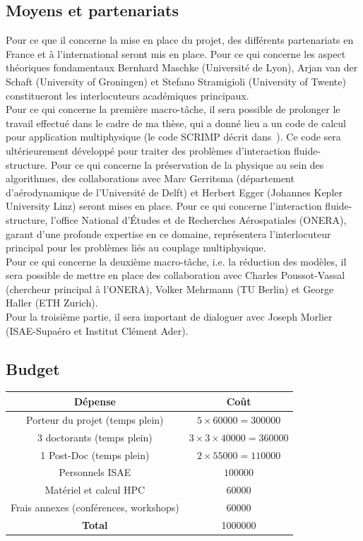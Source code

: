 \documentclass[french]{article}
\begin{document}
\subsection{Moyens et partenariats}
Pour ce que il concerne la mise en place du projet, des différents partenariats en France et \`a l'international seront mis en place. Pour ce qui concerne les aspect théoriques fondamentaux Bernhard Maschke (Universit\'e de Lyon), Arjan van der Schaft (University of Groningen) et Stefano Stramigioli (University of Twente) constitueront les interlocuteurs académiques principaux. \\

Pour ce qui concerne la première macro-tâche, il sera possible de prolonger le travail effectué dans le cadre de ma thèse, qui a donn\'e lieu a un code de calcul pour application multiphysique (le code SCRIMP décrit dans~\cite{brugnoli2021num}). Ce code sera ultérieurement développé pour traiter des problèmes d'interaction fluide-structure. Pour ce qui concerne la préservation de la physique au sein des algorithmes, des collaborations avec Marc Gerritsma (département d'aérodynamique de l'Universit\'e de Delft) et Herbert Egger (Johannes Kepler University Linz) seront mises en place. Pour ce qui concerne l'interaction fluide-structure, l'office National d'Études et de Recherches Aérospatiales (ONERA), garant d'une profonde expertise en ce domaine, représentera l'interlocuteur principal pour les problèmes liés au couplage multiphysique. 
\\


Pour ce qui concerne la deuxième macro-tâche, i.e. la réduction des modèles, il sera possible de mettre en place des collaboration avec Charles Poussot-Vassal (chercheur principal \`a l'ONERA),  Volker Mehrmann (TU Berlin) et George Haller (ETH Zurich). \\

Pour la troisième partie, il sera important de dialoguer avec Joseph Morlier (ISAE-Supa\'ero et Institut Clément Ader).


\subsection{Budget}
\begin{center}
\begin{tabular}{|c|c|}
	\hline
	D\'epense & Co\^{u}t \\
	\hline
	Porteur du projet (temps plein) & $5\times 60000=300000$ \\
	3 doctorants (temps plein) & $3\times 3\times 40000=360000$  \\
	1 Post-Doc (temps plein) & $2\times 55000=110000$ \\
	Personnels ISAE & $100000$ \\
	Matériel  et calcul HPC & $60000$ \\
	Frais annexes (conférences, workshops) & $60000$ \\
	\hline
	\textbf{Total} & 1000000 \\
	\hline
\end{tabular}
\end{center}



\footnotesize


\end{document}
